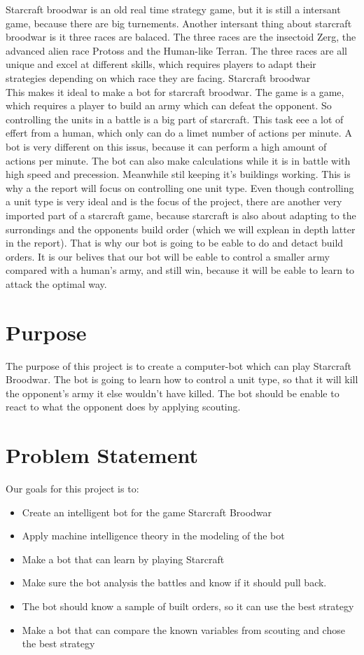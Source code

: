 Starcraft broodwar is an old real time strategy game, but it is still a intersant game, because there are big turnements. Another intersant thing about starcraft
broodwar is it three races are balaced. The three races are the insectoid Zerg, the advanced alien race Protoss and the Human-like Terran. The three races are all unique
and excel at different skills, which requires players to adapt their strategies depending on which race they are facing. Starcraft broodwar \\

This makes it ideal to make a bot for starcraft broodwar. The game is a \abrts game, which requires a player to build an army which can defeat the opponent.
So controlling the units in a battle is a big part of starcraft. This task eee a lot of effert from a human, which only can do a limet number of actions per minute. A bot
is very different on this issus, because it can perform a high amount of actions per minute. The bot can also make calculations while it is in battle with high speed and precession.
Meanwhile stil keeping it's buildings working. This is why a the report will focus on controlling one unit type. Even though controlling a unit type is very ideal and is the focus of
the project, there are another very imported part of a starcraft game, because starcraft is also about adapting to the surrondings and the opponents build order (which we will
explean in depth latter in the report). That is why our bot is going to be eable to do and detact build orders. It is our belives that our bot will be eable to control a  smaller army
compared with a human's army, and still win, because it will be eable to learn to attack the optimal way.


\section{Purpose}
	The purpose of this project is to create a computer-bot which can play Starcraft Broodwar. 
	The bot is going to learn how to control a unit type, so that it will kill the opponent's army it else wouldn't have killed.
	The bot should be enable to react to what the opponent does by applying scouting.

\section{Problem Statement}
	Our goals for this project is to:
	\begin{itemize}
		\item Create an intelligent bot for the game Starcraft Broodwar
		\item Apply machine intelligence theory in the modeling of the bot
		\item Make a bot that can learn by playing Starcraft
		\item Make sure the bot analysis the battles and know if it should pull back.
		\item The bot should know a sample of built orders, so it can use the best strategy
		\item Make a bot that can compare the known variables from scouting and chose the best strategy
	\end{itemize}

